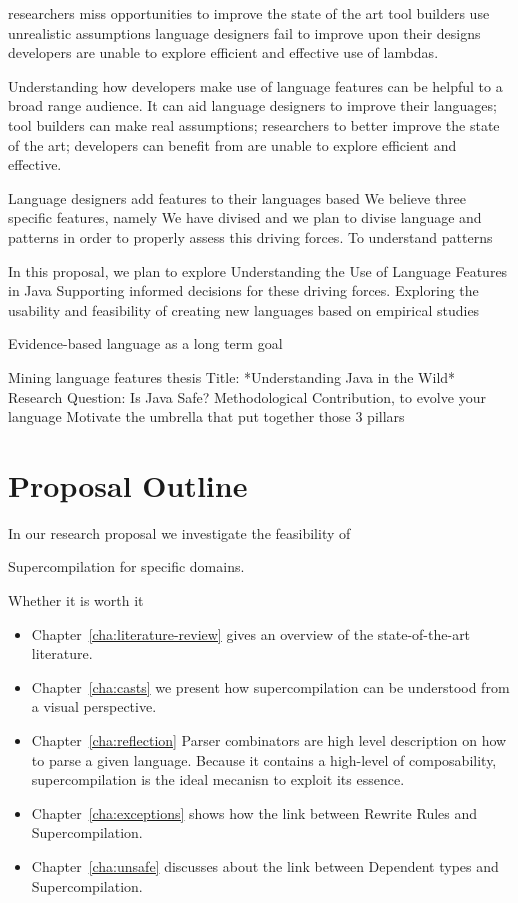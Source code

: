 researchers miss opportunities to improve the state of the art
tool builders use unrealistic assumptions
language designers fail to improve upon their designs
developers are unable to explore efficient and effective use of lambdas.

Understanding how developers make use of language features can be helpful to a broad range audience.
It can aid language designers to improve their languages;
tool builders can make real assumptions;
researchers to better improve the state of the art;
developers can benefit from are unable to explore efficient and effective.

Language designers add features to their languages based
We believe
three specific features, namely
We have divised and we plan to divise language and \api{} patterns in order to properly assess this driving forces.
To understand patterns

In this proposal, we plan to explore
Understanding the Use of Language Features in Java
Supporting informed decisions for these driving forces.
Exploring the usability and feasibility of creating new languages based on empirical studies



Evidence-based language as a long term goal

Mining language features thesis
Title: *Understanding Java in the Wild*
Research Question: Is Java Safe?
Methodological Contribution, to evolve your language
Motivate the umbrella that put together those 3 pillars





\section{Proposal Outline}

In our research proposal we investigate the feasibility of 

Supercompilation for specific domains.

Whether it is worth it

\begin{itemize}

\item Chapter~\ref{cha:literature-review} gives an overview of the state-of-the-art literature.

\item Chapter~\ref{cha:casts} we present how supercompilation can be understood from a visual perspective.

\item Chapter~\ref{cha:reflection} Parser combinators are high level description on how to parse a given language.
Because it contains a high-level of composability, supercompilation is the ideal mecanisn to exploit its essence.

\item Chapter~\ref{cha:exceptions} shows how the link between Rewrite Rules and Supercompilation.

\item Chapter~\ref{cha:unsafe} discusses about the link between Dependent types and Supercompilation.

\end{itemize}


